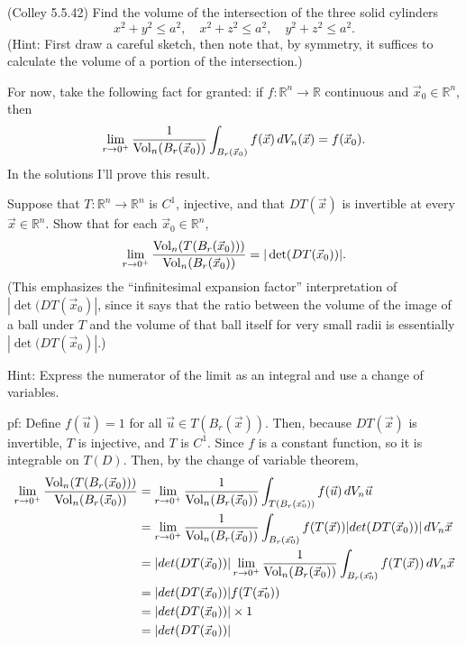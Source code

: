 \documentclass[11pt,letterpaper,cm]{nupset}
\begin{document}
\begin{problem}[Exercise 3] (Colley 5.5.42) Find the volume of the intersection of the three solid cylinders
	\[ x^2+y^2 \le a^2, \quad x^2+z^2 \le a^2, \quad y^2+z^2 \le a^2. \]
	(Hint: First draw a careful sketch, then note that, by symmetry, it suffices to calculate the volume of a portion of the intersection.)
\end{problem}
\begin{solution}
\end{solution}
\newpage

\begin{problem}[Exercise 4] For now, take the following fact for granted: if $f: \mathbb{R}^n \to \mathbb{R}$ continuous and $\vec{x}_0 \in \mathbb{R}^n$, then
	\[ \lim_{r \to 0^+} \frac1{{\rm Vol}_n(B_r(\vec{x}_0))} \int_{B_r(\vec{x}_0)} f(\vec{x})\,dV_n(\vec{x}) = f(\vec{x}_0). \]
	In the solutions I'll prove this result.
	
	Suppose that $T: \mathbb{R}^n \to \mathbb{R}^n$ is $C^1$, injective, and that $DT(\vec{x})$ is invertible at every $\vec{x}\in\mathbb{R}^n$. Show that for each $\vec{x}_0 \in \mathbb{R}^n$,
	\[ \lim_{r \to 0^+} \frac{{\rm Vol}_n(T(B_r(\vec{x}_0)))}{{\rm Vol}_n(B_r(\vec{x}_0))} = |\det(DT(\vec{x}_0))|. \]
	(This emphasizes the ``infinitesimal expansion factor'' interpretation of $|\det(DT(\vec{x}_0)|$, since it says that the ratio between the volume of the image of a ball under $T$ and the volume of that ball itself for very small radii is essentially $|\det(DT(\vec{x}_0)|$.) 
	\medskip
	
	Hint: Express the numerator of the limit as an integral and use a change of variables.
\end{problem}
\begin{solution}
	pf: Define $f(\vec{u})=1$ for all $\vec{u}\in T(B_r(\vec{x}))$. Then, because $DT(\vec{x})$ is invertible, $T$ is injective, and $T$ is $C^1$. Since $f$ is a constant function, so it is integrable on $T(D)$. Then, by the change of variable theorem,
	\begin{align*}
		\lim_{r \to 0^+} \frac{{\rm Vol}_n(T(B_r(\vec{x}_0)))}{{\rm Vol}_n(B_r(\vec{x}_0))}&=\lim_{r \to 0^+} \frac{1}{{\rm Vol}_n(B_r(\vec{x}_0))}\int_{T(B_r(\vec{x_0}))} f(\vec{u})\,dV_n\vec{u}\\
		&=\lim_{r \to 0^+} \frac{1}{{\rm Vol}_n(B_r(\vec{x}_0))}\int_{B_r(\vec{x_0})} f(T(\vec{x}))|det(DT(\vec{x}_0))|\,dV_n\vec{x}\\
		&=|det(DT(\vec{x}_0))|\lim_{r \to 0^+} \frac{1}{{\rm Vol}_n(B_r(\vec{x}_0))}\int_{B_r(\vec{x_0})} f(T(\vec{x}))\,dV_n\vec{x}\\
		&=|det(DT(\vec{x}_0))|f(T(\vec{x_0}))\\
		&=|det(DT(\vec{x}_0))|\times 1\\
		&=|det(DT(\vec{x}_0))|
	\end{align*}
\end{solution}
\newpage
\end{document}
